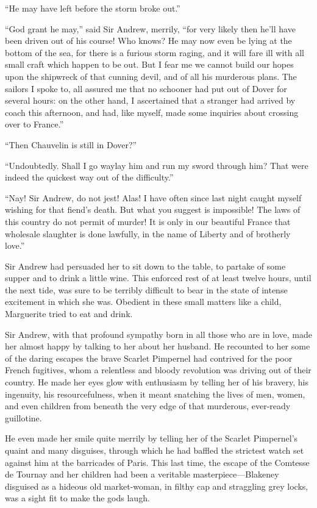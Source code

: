 \enquote{He may have left before the storm broke out.}

\enquote{God grant he may,} said Sir Andrew, merrily, \enquote{for very likely then he'll have been driven out of his course! Who knows? He may now even be lying at the bottom of the sea, for there is a furious storm raging, and it will fare ill with all small craft which happen to be out. But I fear me we cannot build our hopes upon the shipwreck of that cunning devil, and of all his murderous plans. The sailors I spoke to, all assured me that no schooner had put out of Dover for several hours: on the other hand, I ascertained that a stranger had arrived by coach this afternoon, and had, like myself, made some inquiries about crossing over to France.}

\enquote{Then Chauvelin is still in Dover?}

\enquote{Undoubtedly. Shall I go waylay him and run my sword through him? That were indeed the quickest way out of the difficulty.}

\enquote{Nay! Sir Andrew, do not jest! Alas! I have often since last night caught myself wishing for that fiend's death. But what you suggest is impossible! The laws of this country do not permit of murder! It is only in our beautiful France that wholesale slaughter is done lawfully, in the name of Liberty and of brotherly love.}

Sir Andrew had persuaded her to sit down to the table, to partake of some supper and to drink a little wine. This enforced rest of at least twelve hours, until the next tide, was sure to be terribly difficult to bear in the state of intense excitement in which she was. Obedient in these small matters like a child, Marguerite tried to eat and drink.

Sir Andrew, with that profound sympathy born in all those who are in love, made her almost happy by talking to her about her husband. He recounted to her some of the daring escapes the brave Scarlet Pimpernel had contrived for the poor French fugitives, whom a relentless and bloody revolution was driving out of their country. He made her eyes glow with enthusiasm by telling her of his bravery, his ingenuity, his resourcefulness, when it meant snatching the lives of men, women, and even children from beneath the very edge of that murderous, ever-ready guillotine.

He even made her smile quite merrily by telling her of the Scarlet Pimpernel's quaint and many disguises, through which he had baffled the strictest watch set against him at the barricades of Paris. This last time, the escape of the Comtesse de Tournay and her children had been a veritable masterpiece---Blakeney disguised as a hideous old market-woman, in filthy cap and straggling grey locks, was a sight fit to make the gods laugh.

